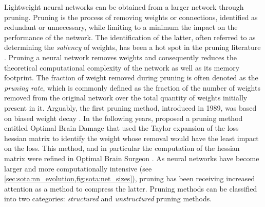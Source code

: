 Lightweight neural networks can be obtained from a larger network through
pruning. Pruning is the process of removing weights or connections, identified
as redundant or unnecessary, while limiting to a minimum the impact on the
performance of the network. The identification of the latter, often referred to
as determining the \emph{saliency} of weights, has been a hot spot in the
pruning literature \cite{li2023model,cheng2017survey,liang2021pruning}. Pruning
a neural network removes weights and consequently reduces the theoretical
computational complexity of the network as well as its memory footprint.  The
fraction of weight removed during pruning is often denoted as the \emph{pruning
rate}, which is commonly defined as the fraction of the number of weights
removed from the original network over the total quantity of weights initially
present in it. Arguably, the first pruning method, introduced in 1989, was based
on biased weight decay \cite{hanson1988comparing}. In the following years,
\citeauthor{DBLP:conf/nips/CunDS89} proposed a pruning method entitled Optimal
Brain Damage that used the Taylor expansion of the loss hessian matrix to
identify the weight whose removal would have the least impact on the loss. This
method, and in particular the computation of the hessian matrix were refined in
Optimal Brain Surgeon
\cite{DBLP:conf/nips/HassibiS92,DBLP:conf/nips/HassibiSW93,DBLP:conf/icnn/HassibiSW93}.
As neural networks have become larger and more computationally intensive (see
\cref{sec:sota:nn_evolution,fig:sota:net_sizes}), pruning has been receiving
increased attention as a method to compress the latter. Pruning methods can be
classified into two categories: \emph{structured} and \emph{unstructured}
pruning methods.\\


